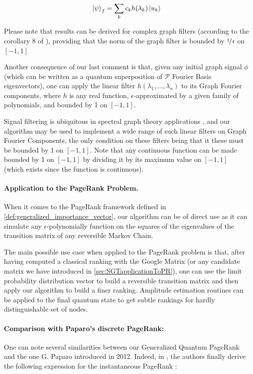 \documentclass{article}
\begin{document}
\begin{equation}
    \ket{\psi}_f = \sum_k c_k h(\lambda_k) \ket{u_k} 
\end{equation}

Please note that results can be derived for complex graph filters (according to the corollary 8 of \cite{gilyén_su_low_wiebe_2019}), providing that the norm of the graph filter is bounded by $\nicefrac{1}{4}$ on $[-1,1]$

Another consequence of our last comment is that, given any initial graph signal $\phi$ (which can be written as a quantum superposition of $\mathcal{P}$ Fourier Basis eigenvectors), one can apply the linear filter $h(\lambda_1, \hdots, \lambda_n)$ to its Graph Fourier components, where $h$ is any real function, $\epsilon$-approximated by a given family of polynomials, and bounded by 1 on $[-1,1]$.

Signal filtering is ubiquitous in spectral graph theory applications \cite{sandryhaila_moura_2014, shuman_narang_frossard_ortega_vandergheynst_2013, sevi2019, ortega_frossard_kovacevic_moura_vandergheynst_2018}, and our algorithm may be used to implement a wide range of such linear filters on Graph Fourier Components, the only condition on these filters being that it these must be bounded by 1 on $[-1,1]$. Note that any continuous function can be made bounded by 1 on $[-1,1]$ by dividing it by its maximum value on $[-1,1]$ (which exists since the function is continuous).

\paragraph{Application to the PageRank Problem.}
When it comes to the PageRank framework defined in \ref{def:generalized_importance_vector}, our algorithm can be of direct use as it can simulate any $\epsilon$-polynomially function on the squares of the eigenvalues of the transition matrix of any reversible Markov Chain.

The main possible use case when applied to the PageRank problem is that, after having computed a classical ranking with the Google Matrix (or any candidate matrix we have introduced in \ref{sec:SGTapplicationToPR}), one can use the limit probability distribution vector to build a reversible transition matrix and then apply our algorithm to build a finer ranking. Amplitude estimation routines can be applied to the final quantum state to get subtle rankings for hardly distinguishable set of nodes.

\paragraph{Comparison with Paparo's discrete PageRank:} One can note several similarities between our Generalized Quantum PageRank and the one G. Paparo introduced in 2012. Indeed, in \cite{paparo_martin-delgado_2012}, the authors finally derive the following expression for the instantaneous PageRank :
\end{document}
